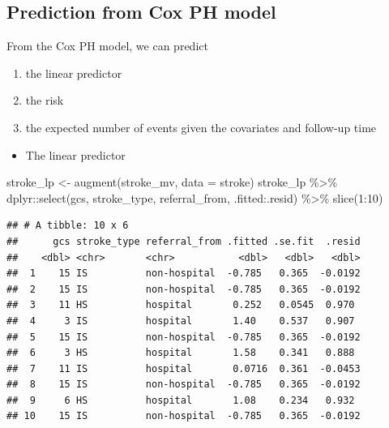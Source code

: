 \documentclass[
  10pt,
]{krantz}
\newenvironment{Shaded}{\begin{snugshade}}{\end{snugshade}}
\newcommand{\AttributeTok}[1]{\textcolor[rgb]{0.77,0.63,0.00}{#1}}
\newcommand{\DecValTok}[1]{\textcolor[rgb]{0.00,0.00,0.81}{#1}}
\newcommand{\FunctionTok}[1]{\textcolor[rgb]{0.00,0.00,0.00}{#1}}
\newcommand{\NormalTok}[1]{#1}
\newcommand{\OtherTok}[1]{\textcolor[rgb]{0.56,0.35,0.01}{#1}}
\newcommand{\SpecialCharTok}[1]{\textcolor[rgb]{0.00,0.00,0.00}{#1}}
\providecommand{\tightlist}{%
  \setlength{\itemsep}{0pt}\setlength{\parskip}{0pt}}
\begin{document}
\hypertarget{prediction-from-cox-ph-model}{%
\subsection{Prediction from Cox PH model}\label{prediction-from-cox-ph-model}}

From the Cox PH model, we can predict

\begin{enumerate}
\def\labelenumi{\arabic{enumi}.}
\tightlist
\item
  the linear predictor
\item
  the risk
\item
  the expected number of events given the covariates and follow-up time
\end{enumerate}

\begin{itemize}
\tightlist
\item
  The linear predictor
\end{itemize}

\begin{Shaded}
\begin{Highlighting}[]
\NormalTok{stroke\_lp }\OtherTok{\textless{}{-}} \FunctionTok{augment}\NormalTok{(stroke\_mv, }\AttributeTok{data =}\NormalTok{ stroke)}
\NormalTok{stroke\_lp }\SpecialCharTok{\%\textgreater{}\%}
\NormalTok{  dplyr}\SpecialCharTok{::}\FunctionTok{select}\NormalTok{(gcs, stroke\_type, referral\_from, .fitted}\SpecialCharTok{:}\NormalTok{.resid) }\SpecialCharTok{\%\textgreater{}\%}
  \FunctionTok{slice}\NormalTok{(}\DecValTok{1}\SpecialCharTok{:}\DecValTok{10}\NormalTok{)}
\end{Highlighting}
\end{Shaded}

\begin{verbatim}
## # A tibble: 10 x 6
##      gcs stroke_type referral_from .fitted .se.fit  .resid
##    <dbl> <chr>       <chr>           <dbl>   <dbl>   <dbl>
##  1    15 IS          non-hospital  -0.785   0.365  -0.0192
##  2    15 IS          non-hospital  -0.785   0.365  -0.0192
##  3    11 HS          hospital       0.252   0.0545  0.970 
##  4     3 IS          hospital       1.40    0.537   0.907 
##  5    15 IS          non-hospital  -0.785   0.365  -0.0192
##  6     3 HS          hospital       1.58    0.341   0.888 
##  7    11 IS          hospital       0.0716  0.361  -0.0453
##  8    15 IS          non-hospital  -0.785   0.365  -0.0192
##  9     6 HS          hospital       1.08    0.234   0.932 
## 10    15 IS          non-hospital  -0.785   0.365  -0.0192
\end{verbatim}
\end{document}
